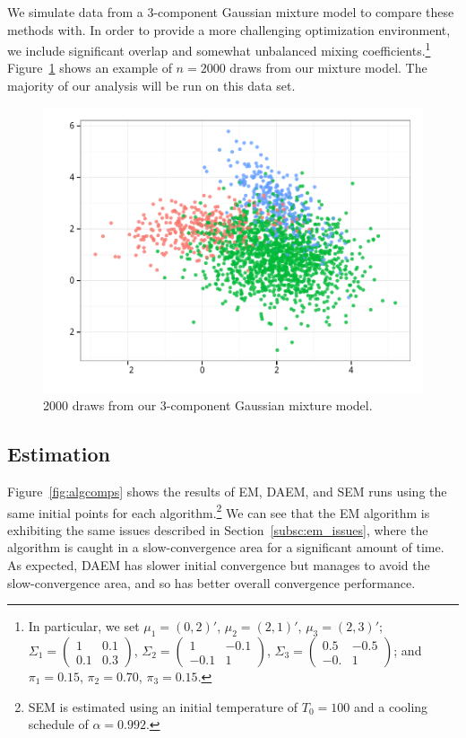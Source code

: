 \documentclass{article}
\theoremstyle{definition}
\theoremstyle{algodesc}
\begin{document}
We simulate data from a 3-component Gaussian mixture model to compare these methods with. In order to provide a more challenging optimization environment, we include significant overlap and somewhat unbalanced mixing coefficients.\footnote{In particular, we set $\mu_1 = (0, 2)'$, $\mu_2 = (2, 1)'$, $\mu_3 = (2, 3)'$; $\Sigma_1 = \begin{pmatrix} 1 & 0.1 \\ 0.1 & 0.3 \end{pmatrix}$, $\Sigma_2 = \begin{pmatrix} 1 & -0.1 \\ -0.1 & 1 \end{pmatrix}$, $\Sigma_3 = \begin{pmatrix} 0.5 & -0.5 \\ -0. & 1 \end{pmatrix}$; and $\pi_1 = 0.15$, $\pi_2 = 0.70$, $\pi_3 = 0.15$.} Figure~\ref{fig:sim_data} shows an example of $n=2000$ draws from our mixture model. The majority of our analysis will be run on this data set.

\begin{figure}[htb] \centering
  \includegraphics[width=.45\linewidth]{include/sim_data.pdf}
  \caption{2000 draws from our 3-component Gaussian mixture model.}
  \label{fig:sim_data}
\end{figure}


\subsection{Estimation}

Figure~\ref{fig:algcomps} shows the results of EM, DAEM, and SEM runs using the same initial points for each algorithm.\footnote{SEM is estimated using an initial temperature of $T_0 = 100$ and a cooling schedule of $\alpha = 0.992$.} We can see that the EM algorithm is exhibiting the same issues described in Section~\ref{subsc:em_issues}, where the algorithm is caught in a slow-convergence area for a significant amount of time. As expected, DAEM has slower initial convergence but manages to avoid the slow-convergence area, and so has better overall convergence performance.
\end{document}
